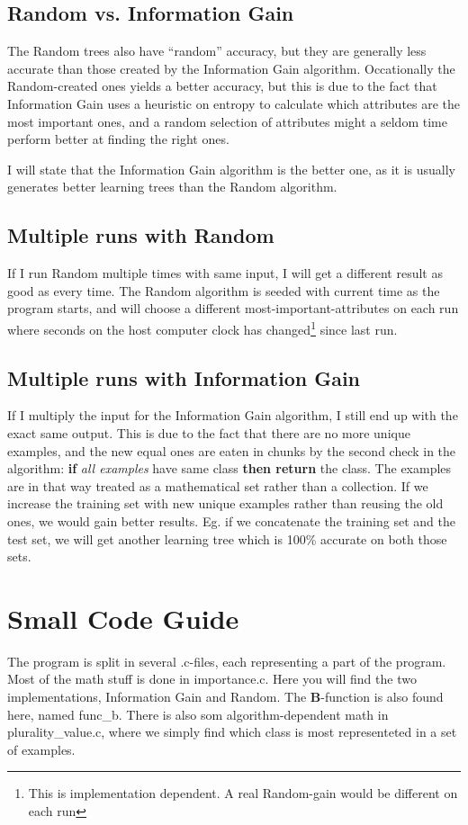 \documentclass[english,a4paper]{scrartcl}
\begin{document}
\subsection{Random vs. Information Gain}
The Random trees also have ``random'' accuracy, but they are generally less
accurate than those created by the Information Gain algorithm. Occationally the
Random-created ones yields a better accuracy, but this is due to the fact that
Information Gain uses a heuristic on entropy to calculate which attributes are
the most important ones, and a random selection of attributes might a seldom
time perform better at finding the right ones.

I will state that the Information Gain algorithm is the better one, as it is
usually generates better learning trees than the Random algorithm.

\subsection{Multiple runs with Random}
If I run Random multiple times with same input, I will get a different result as
good as every time. The Random algorithm is seeded with current time as the
program starts, and will choose a different {\ttfamily
most-important}-attributes on each run where seconds on the host computer clock
has changed\footnote{This is implementation dependent. A real Random-gain would
be different on each run} since last run.

\subsection{Multiple runs with Information Gain}
If I multiply the input for the Information Gain algorithm, I still end up with
the exact same output. This is due to the fact that there are no more unique
examples, and the new equal ones are eaten in chunks by the second check in the
algorithm: {\ttfamily \textbf{if} \textit{all examples} have same class 
\textbf{then return} the class}. The examples are in that way treated as a
mathematical set rather than a collection. If we increase the training set with
new unique examples rather than reusing the old ones, we would gain better
results. Eg. if we concatenate the training set and the test set, we will get
another learning tree which is 100\% accurate on both those sets.

\section{Small Code Guide}
The program is split in several {\ttfamily .c}-files, each representing a part
of the program. Most of the math stuff is done in {\ttfamily importance.c}. Here
you will find the two implementations, Information Gain and Random. The
\textbf{B}-function is also found here, named {\ttfamily func\_b}. There is also
som algorithm-dependent math in {\ttfamily plurality\_value.c}, where we simply
find which class is most representeted in a set of examples.
\end{document}
